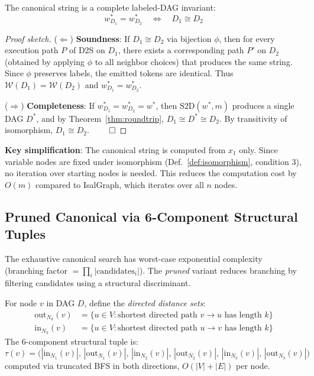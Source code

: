 \begin{theorem}
\label{thm:invariant}
The canonical string is a complete labeled-DAG invariant:
\[
  w^*_{D_1} = w^*_{D_2} \quad \Longleftrightarrow \quad D_1 \cong D_2
\]
\end{theorem}

\begin{proof}[Proof sketch]
($\Leftarrow$) \textbf{Soundness}: If $D_1 \cong D_2$ via bijection $\phi$, then for every
execution path $P$ of D2S on $D_1$, there exists a corresponding path $P'$ on $D_2$
(obtained by applying $\phi$ to all neighbor choices) that produces the same string.
Since $\phi$ preserves labels, the emitted tokens are identical. Thus
$\mathcal{W}(D_1) = \mathcal{W}(D_2)$ and $w^*_{D_1} = w^*_{D_2}$.

($\Rightarrow$) \textbf{Completeness}: If $w^*_{D_1} = w^*_{D_2} = w^*$, then
$\text{S2D}(w^*, m)$ produces a single DAG $D^*$, and by Theorem~\ref{thm:roundtrip},
$D_1 \cong D^* \cong D_2$. By transitivity of isomorphism, $D_1 \cong D_2$. $\qed$
\end{proof}

\textbf{Key simplification}: The canonical string is computed from $x_1$ only.
Since variable nodes are fixed under isomorphism (Def.~\ref{def:isomorphism},
condition 3), no iteration over starting nodes is needed. This reduces
the computation cost by $O(m)$ compared to IsalGraph, which iterates
over all $n$ nodes.

\subsection{Pruned Canonical via 6-Component Structural Tuples}

The exhaustive canonical search has worst-case exponential complexity
(branching factor $= \prod_i |\text{candidates}_i|$). The \emph{pruned} variant
reduces branching by filtering candidates using a structural discriminant.

\begin{definition}
\label{def:6tuple}
For node $v$ in DAG $D$, define the \emph{directed distance sets}:
\begin{align}
  \text{out}_{N_k}(v) &= \{u \in V : \text{shortest directed path } v \to u \text{ has length } k\} \\
  \text{in}_{N_k}(v) &= \{u \in V : \text{shortest directed path } u \to v \text{ has length } k\}
\end{align}
The 6-component structural tuple is:
\[
  \tau(v) = \big(|\text{in}_{N_1}(v)|,\, |\text{out}_{N_1}(v)|,\,
             |\text{in}_{N_2}(v)|,\, |\text{out}_{N_2}(v)|,\,
             |\text{in}_{N_3}(v)|,\, |\text{out}_{N_3}(v)|\big)
\]
computed via truncated BFS in both directions, $O(|V| + |E|)$ per node.
\end{definition}

